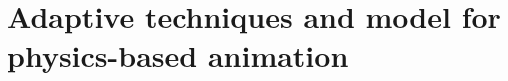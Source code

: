 \documentclass[11pt, oneside, a4paper]{memoir}
\begin{document}
%
%
%
%
%
%
%
%
%
%
%

\section{Adaptive techniques and model for physics-based animation}
\end{document}
